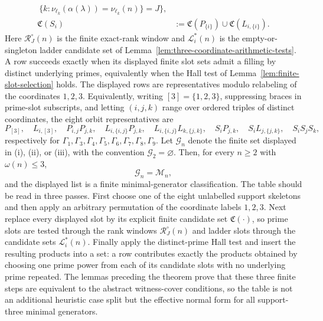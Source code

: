 \begin{theorem}
\[\begin{aligned}
\ \{k:\nu_{\ell_k}(\alpha(\lambda))=\nu_{\ell_k}(n)\}=J\},\\
\mathfrak C(S_i)&:=\mathfrak C(P_{\{i\}})\cup \mathfrak C(L_{i,\{i\}}).
\end{aligned}
\]
Here $\mathcal R_J^\circ(n)$ is the finite exact-rank window and
$\mathcal L_i^*(n)$ is the empty-or-singleton ladder candidate set of
Lemma~\ref{lem:three-coordinate-arithmetic-tests}. A row succeeds
exactly when its displayed finite slot sets admit a filling by distinct
underlying primes, equivalently when the Hall test of
Lemma~\ref{lem:finite-slot-selection} holds.  The displayed rows are
representatives modulo relabeling of the coordinates $1,2,3$.
Equivalently, writing $[3]=\{1,2,3\}$, suppressing braces in prime-slot
subscripts, and letting $(i,j,k)$ range over ordered triples of distinct
coordinates, the eight orbit representatives are
\[
P_{[3]},\quad L_{i,[3]},\quad P_{i,j}P_{j,k},\quad
L_{i,\{i,j\}}P_{j,k},\quad
L_{i,\{i,j\}}L_{k,\{j,k\}},\quad S_iP_{j,k},
\quad S_iL_{j,\{j,k\}},\quad S_iS_jS_k,
\]
respectively for $\Gamma_1,\Gamma_3,\Gamma_4,\Gamma_5,\Gamma_6,\Gamma_7,
\Gamma_8,\Gamma_9$.
Let $\mathcal G_n$ denote the finite set displayed in (i), (ii), or (iii), with
the convention $\mathcal G_2=\varnothing$.  Then, for every $n\ge2$ with
$\omega(n)\le3$,
\[
\mathcal G_n=\mathcal M_n,
\]
and the displayed list is a finite minimal-generator classification. The
table should be read in three passes.  First choose one of the eight
unlabelled support skeletons and then apply an arbitrary permutation of the
coordinate labels $1,2,3$.  Next replace every displayed slot by its explicit
finite candidate set $\mathfrak C(\cdot)$, so prime slots are tested through
the rank windows $\mathcal R_J^\circ(n)$ and ladder slots through the candidate
sets $\mathcal L_i^*(n)$. Finally apply the distinct-prime Hall test and insert
the resulting products into a set: a row
contributes exactly the products obtained by choosing one prime power from each
of its candidate slots with no underlying prime repeated.  The lemmas preceding
the theorem prove that these three finite steps are equivalent to the abstract
witness-cover conditions, so the table is not an additional heuristic case
split but the effective normal form for all support-three minimal generators.


\end{theorem}

